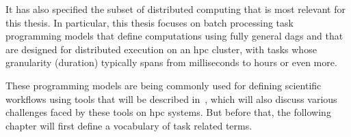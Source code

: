It has also specified the subset of distributed computing that is most relevant for this thesis. In
particular, this thesis focuses on batch processing task programming models that define
computations using fully general \glspl{dag} and that are designed for distributed
execution on an \gls{hpc} cluster, with tasks whose granularity (duration) typically
spans from milliseconds to hours or even more.

These programming models are being commonly used for defining scientific workflows using tools that
will be described in~, which will also discuss various challenges faced by
these tools on \gls{hpc} systems. But before that, the following chapter will first
define a vocabulary of task related terms.

